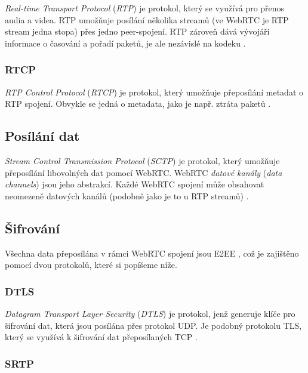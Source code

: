 \textit{Real-time Transport Protocol} (\textit{RTP}) je protokol, který se
využívá pro přenos audia a videa. RTP umožňuje posílání několika streamů (ve
WebRTC je RTP stream jedna stopa) přes jedno peer-spojení. RTP zároveň dává
vývojáři informace o časování a pořadí paketů, je ale nezávislé na kodeku
\parencite{WebRTCForTheCurious}.

\subsubsection{RTCP}\label{rtcp}

\textit{RTP Control Protocol} (\textit{RTCP}) je protokol, který umožňuje
přeposílání metadat o RTP spojení. Obvykle se jedná o metadata, jako je např.
ztráta paketů \parencite{WebRTCForTheCurious}.

\subsection{Posílání dat}\label{sctp}

\textit{Stream Control Transmission Protocol} (\textit{SCTP}) je protokol, který
umožňuje přeposílání libovolných dat pomocí WebRTC. WebRTC \textit{datové
    kanály} (\textit{data channels}) jsou jeho abstrakcí. Každé WebRTC spojení může
obsahovat neomezeně datových kanálů (podobně jako je to u RTP streamů)
\parencite{WebRTCForTheCurious}.

\subsection{Šifrování}

Všechna data přeposílána v rámci WebRTC spojení jsou E2EE
\parencite{WebRTCForTheCurious}, což je zajištěno pomocí dvou protokolů, které si
popíšeme níže.

\subsubsection{DTLS}

\textit{Datagram Transport Layer Security} (\textit{DTLS}) je protokol, jenž
generuje klíče pro šifrování dat, která jsou posílána přes protokol UDP. Je
podobný protokolu TLS, který se využívá k šifrování dat přeposílaných TCP
\parencite{WebRTCForTheCurious}.

\subsubsection{SRTP}\label{srtp}

